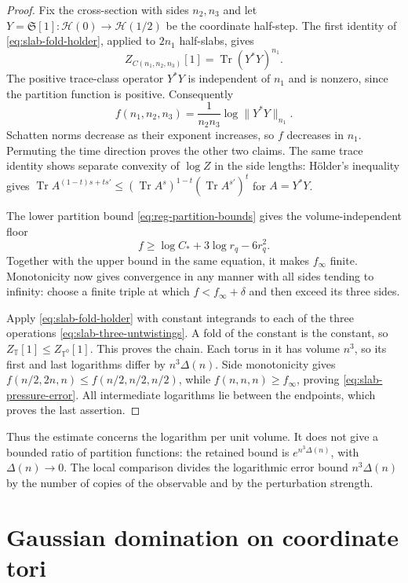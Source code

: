\documentclass[11pt,letterpaper,reqno]{amsart}
\begin{document}
\begin{proof}
Fix the cross-section with sides $n_2,n_3$ and let
$Y=\mathfrak S[1]:\mathcal H(0)\to\mathcal H(1/2)$ be the coordinate
half-step. The first identity of \eqref{eq:slab-fold-holder}, applied
to $2n_1$ half-slabs, gives
\begin{equation}\label{eq:slab-pressure-trace}
 Z_{C(n_1,n_2,n_3)}[1]=\operatorname{Tr}(Y^*Y)^{n_1}.
\end{equation}
The positive trace-class operator $Y^*Y$ is independent of $n_1$ and
is nonzero, since the partition function is positive. Consequently
\[
 f(n_1,n_2,n_3)=\frac1{n_2n_3}\log\|Y^*Y\|_{n_1}.
\]
Schatten norms decrease as their exponent increases, so $f$ decreases
in $n_1$. Permuting the time direction proves the other two claims.
The same trace identity shows separate convexity of $\log Z$ in the
side lengths: H\"older's inequality gives
$\operatorname{Tr}A^{(1-t)s+ts'}\le
 (\operatorname{Tr}A^s)^{1-t}(\operatorname{Tr}A^{s'})^t$ for $A=Y^*Y$.

The lower partition bound \eqref{eq:reg-partition-bounds} gives the
volume-independent floor
\[
 f\ge\log C_*+3\log r_q-6r_q^2.
\]
Together with the upper bound in the same equation, it makes
$f_\infty$ finite. Monotonicity now gives convergence in any manner
with all sides tending to infinity: choose a finite triple at which
$f<f_\infty+\delta$ and then exceed its three sides.

Apply \eqref{eq:slab-fold-holder} with constant integrands to each of
the three operations \eqref{eq:slab-three-untwistings}. A fold of
the constant is the constant, so $Z_{\mathbb T}[1]\le Z_{\mathbb T^0}[1]$.
This proves the chain. Each torus in it has volume $n^3$, so its first
and last logarithms differ by $n^3\Delta(n)$. Side monotonicity gives
$f(n/2,2n,n)\le f(n/2,n/2,n/2)$, while
$f(n,n,n)\ge f_\infty$, proving \eqref{eq:slab-pressure-error}.
All intermediate logarithms lie between the endpoints, which proves
the last assertion.
\end{proof}

Thus the estimate concerns the logarithm per unit volume. It does not
give a bounded ratio of partition functions: the retained bound is
$e^{n^3\Delta(n)}$, with $\Delta(n)\to0$. The local comparison
divides the logarithmic error bound $n^3\Delta(n)$ by the number of
copies of the observable and by the perturbation strength.

\section{Gaussian domination on coordinate tori}\label{sec:coordinate}
\end{document}
